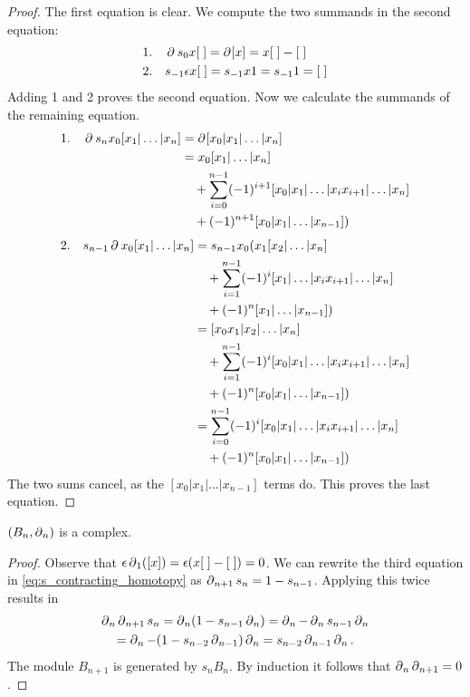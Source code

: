 \begin{proof}
The first equation is clear.
We compute the two summands in the second equation:
\begin{align*}
1.\quad & \operatorname{\partial}_{} s_0 x[\;] = \operatorname{\partial}_{}[x] = x [\;] - [\;] \\
2.\quad & s_{-1}\epsilon x[\;] = s_{-1} x 1 = s_{-1} 1 = [\;]
\end{align*}
Adding 1 and 2 proves the second equation.
Now we calculate the summands of the remaining equation.
\begin{equation*}
\begin{split}
1.\quad \operatorname{\partial}_{}s_n x_0[x_1|\dots|x_n]
&= \operatorname{\partial}_{} [x_0|x_1|\dots|x_n] \\
&= x_0[x_1|\dots|x_n]\\
&\quad + \sum_{i=0}^{n-1}(-1)^{i+1} [x_0|x_1|\dots|x_i x_{i+1}|\dots|x_n]\\
&\quad + (-1)^{n+1} [x_0|x_1|\dots|x_{n-1}])
\end{split}
\end{equation*}
\begin{equation*}
\begin{split}
2.\quad s_{n-1}\operatorname{\partial}_{} x_0[x_1|\dots|x_n]
&= s_{n-1} x_0 (x_1[x_2|\dots|x_n] \\
&\quad +\sum_{i=1}^{n-1}(-1)^i [x_1|\dots|x_i x_{i+1}|\dots|x_n] \\
&\quad +(-1)^n [x_1|\dots|x_{n-1}]) \\
&= [x_0 x_1|x_2|\dots|x_n] \\
&\quad +\sum_{i=1}^{n-1}(-1)^i [x_0|x_1|\dots|x_i x_{i+1}|\dots|x_n] \\
&\quad +(-1)^n [x_0|x_1|\dots|x_{n-1}]) \\
&= \sum_{i=0}^{n-1}(-1)^i [x_0|x_1|\dots|x_i x_{i+1}|\dots|x_n] \\
&\quad +(-1)^n [x_0|x_1|\dots|x_{n-1}])
\end{split}
\end{equation*}
The two sums cancel, as the $[x_0|x_1|\dots|x_{n-1}]$ terms do.
This proves the last equation.
\end{proof}
\begin{lemma}
\label{lemma:B_complex}
$(B_n,\operatorname{\partial}_{n})$ is a complex.
\end{lemma}
\begin{proof}
Observe that 
$\epsilon\operatorname{\partial}_{1}([x])=\epsilon (x[\;]-[\;]) = 0$.
We can rewrite the third equation in \eqref{eq:s_contracting_homotopy} as
$\operatorname{\partial}_{n+1}s_n = 1- s_{n-1}$.
Applying this twice results in
\begin{multline}
\label{eq:B_complex}
\operatorname{\partial}_{n}\operatorname{\partial}_{n+1}s_n
= \operatorname{\partial}_{n}(1- s_{n-1}\operatorname{\partial}_{n})
= \operatorname{\partial}_{n}-\operatorname{\partial}_{n}s_{n-1}\operatorname{\partial}_{n} \\
= \operatorname{\partial}_{n}-(1- s_{n-2}\operatorname{\partial}_{n-1})\operatorname{\partial}_{n}
= s_{n-2}\operatorname{\partial}_{n-1}\operatorname{\partial}_{n}.
\end{multline}
The module $B_{n+1}$ is generated by $s_{n} B_{n}$.
By induction it follows that $\operatorname{\partial}_{n}\operatorname{\partial}_{n+1} = 0$.
\end{proof}

